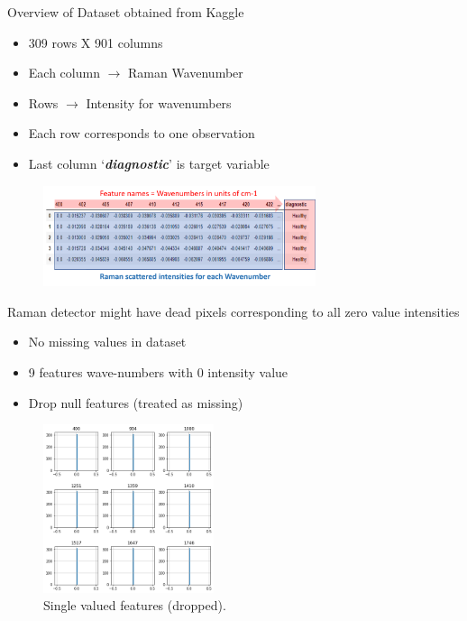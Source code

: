 \begin{frame}{Overview of Dataset obtained from Kaggle}

\begin{itemize}
    \item 309 rows X 901 columns
    \item Each column $\rightarrow$ Raman Wavenumber
	\item Rows $\rightarrow$ Intensity for wavenumbers
	\item Each row corresponds to one observation
	\item Last column `\textit{\textbf{diagnostic}}' is target variable
\end{itemize}

	\begin{figure}
		
		\includegraphics[width=8.0cm]{figures/raman_dataset.png}
	\end{figure}


\end{frame}

\begin{frame}{Raman detector might have dead pixels corresponding to all zero value intensities}

\begin{itemize}
    \item No missing values in dataset
	\item 9 features wave-numbers with 0 intensity value
	\item Drop null features (treated as missing)
\end{itemize}

	\begin{figure}
		
		\includegraphics[width=5.0cm]{figures/dropped.png}
		\caption{Single valued features (dropped).}
	\end{figure}


\end{frame}

